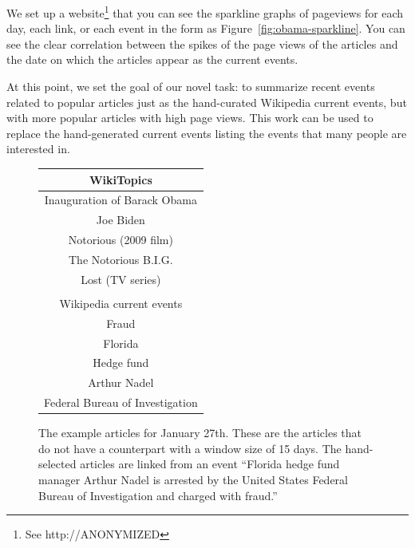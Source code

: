 \documentclass[11pt]{article}
\newcommand{\war}[1]{{\sf\small #1}}
\begin{document}
We set up a website\footnote{See http://ANONYMIZED} that you can see the sparkline graphs of pageviews for each day, each link, or each event in the form as Figure~\ref{fig:obama-sparkline}. You can see the clear correlation between the spikes of the page views of the articles and the date on which the articles appear as the current events.

At this point, we set the goal of our novel task: to summarize recent events related to popular articles just as the hand-curated Wikipedia current events, but with more popular articles with high page views. This work can be used to replace the hand-generated current events listing the events that many people are interested in.

\begin{figure}
\centering
\begin{tabular}{c}
WikiTopics \\
\hline
\war{Inauguration of Barack Obama} \\
\war{Joe Biden} \\
\war{Notorious (2009 film)} \\
\war{The Notorious B.I.G.} \\
\war{Lost (TV series)} \\
\\
Wikipedia current events \\
\hline
\war{Fraud} \\
\war{Florida} \\
\war{Hedge fund} \\
\war{Arthur Nadel} \\
\war{Federal Bureau of Investigation} \\
\end{tabular}
\caption{ The example articles for January 27th. These are the articles that do not have a counterpart with a window size of 15 days. The hand-selected articles are linked from an event ``Florida hedge fund manager Arthur Nadel is arrested by the United States Federal Bureau of Investigation and charged with fraud.'' \\ }
\label{fig:comparison-articles}
\end{figure}

\end{document}
